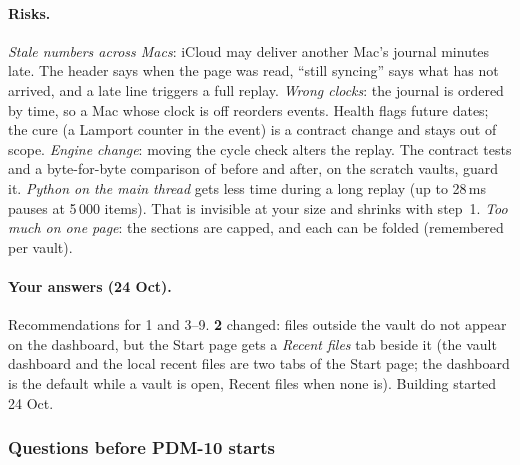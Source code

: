 \paragraph{Risks.} \emph{Stale numbers across Macs}: iCloud may deliver another Mac's journal minutes late. The header says when
the page was read, ``still syncing'' says what has not arrived, and a late line triggers a full replay. \emph{Wrong
clocks}: the journal is ordered by time, so a Mac whose clock is off reorders events. Health flags future dates; the cure
(a Lamport counter in the event) is a contract change and stays out of scope. \emph{Engine change}: moving the cycle check
alters the replay. The contract tests and a byte-for-byte comparison of  before and after, on the scratch
vaults, guard it. \emph{Python on the main thread} gets less time during a long replay (up to 28\,ms pauses at 5\,000
items). That is invisible at your size and shrinks with step~1. \emph{Too much on one page}: the sections are capped, and
each can be folded (remembered per vault).

\paragraph{Your answers (24 Oct).} Recommendations for 1 and 3--9. \textbf{2} changed: files outside the vault
do not appear on the dashboard, but the Start page gets a \emph{Recent files} tab beside it (the vault dashboard and the
local recent files are two tabs of the Start page; the dashboard is the default while a vault is open, Recent files
when none is). Building started 24 Oct.

\subsubsection*{Questions before PDM-10 starts}

